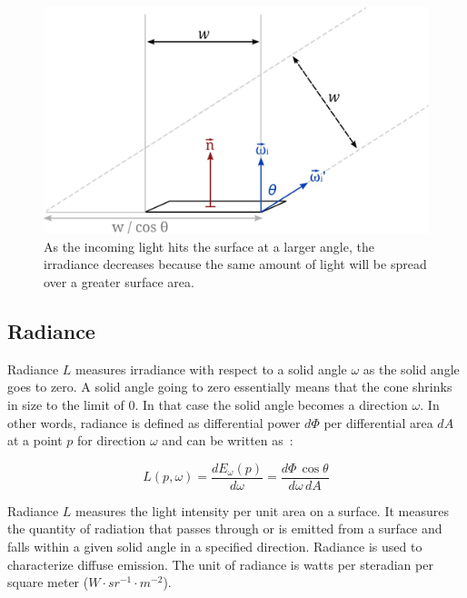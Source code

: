 \documentclass[11pt,a4paper]{report}
\begin{document}
\begin{figure}
\begin{center}
\includegraphics[scale=1.0]{images/svg/irradiance_radiance.jpg}
\caption{As the incoming light hits the surface at a larger angle, the irradiance decreases because the same amount of light will be spread over a greater surface area.}
\label{cosine_term_visualization}
\end{center}
\end{figure}


\subsection{Radiance}

Radiance $L$ measures irradiance with respect to a solid angle $\omega$ as the solid angle goes to zero. A solid angle going to zero essentially means that the cone shrinks in size to the limit of 0. In that case the solid angle becomes a direction $\omega$. In other words, radiance is defined as differential power $d\Phi$ per differential area $dA$ at a point $p$ for direction $\omega$ and can be written as~\cite{pharr2017}:

\begin{equation}
L(p, \omega) = \frac{d E_\omega(p)}{d \omega} = \frac{d\Phi\, \cos \theta}{d\omega\, dA}
\end{equation}

Radiance $L$ measures the light intensity per unit area on a surface. It measures the quantity of radiation that passes through or is emitted from a surface and falls within a given solid angle in a specified direction. Radiance is used to characterize diffuse emission. The unit of radiance is watts per steradian per square meter ($W \cdot {sr}^{-1} \cdot m^{-2}$).
\end{document}
